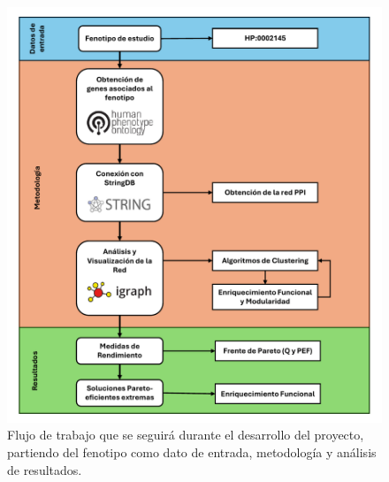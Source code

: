 
\begin{figure}[h]
	\centering
	\includegraphics[width=1\linewidth]{figures/methods/Flujo_de_trabajo_final.pdf}
	\caption{Flujo de trabajo que se seguirá durante el desarrollo del proyecto, partiendo del fenotipo como dato de entrada, metodología y análisis de resultados.}
	\label{fig:flujo_trabajo}
\end{figure}


